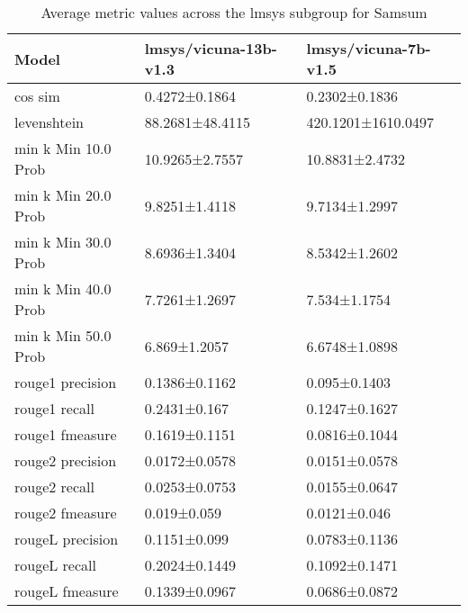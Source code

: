 \begin{table}
\caption{Average metric values across the lmsys subgroup for Samsum}
\label{tab:}
\begin{tabular}{lll}
\toprule
Model & lmsys/vicuna-13b-v1.3 & lmsys/vicuna-7b-v1.5 \\
\midrule
cos sim & 0.4272±0.1864 & 0.2302±0.1836 \\
levenshtein & 88.2681±48.4115 & 420.1201±1610.0497 \\
min k Min 10.0 Prob & 10.9265±2.7557 & 10.8831±2.4732 \\
min k Min 20.0 Prob & 9.8251±1.4118 & 9.7134±1.2997 \\
min k Min 30.0 Prob & 8.6936±1.3404 & 8.5342±1.2602 \\
min k Min 40.0 Prob & 7.7261±1.2697 & 7.534±1.1754 \\
min k Min 50.0 Prob & 6.869±1.2057 & 6.6748±1.0898 \\
rouge1 precision & 0.1386±0.1162 & 0.095±0.1403 \\
rouge1 recall & 0.2431±0.167 & 0.1247±0.1627 \\
rouge1 fmeasure & 0.1619±0.1151 & 0.0816±0.1044 \\
rouge2 precision & 0.0172±0.0578 & 0.0151±0.0578 \\
rouge2 recall & 0.0253±0.0753 & 0.0155±0.0647 \\
rouge2 fmeasure & 0.019±0.059 & 0.0121±0.046 \\
rougeL precision & 0.1151±0.099 & 0.0783±0.1136 \\
rougeL recall & 0.2024±0.1449 & 0.1092±0.1471 \\
rougeL fmeasure & 0.1339±0.0967 & 0.0686±0.0872 \\
\bottomrule
\end{tabular}
\end{table}
